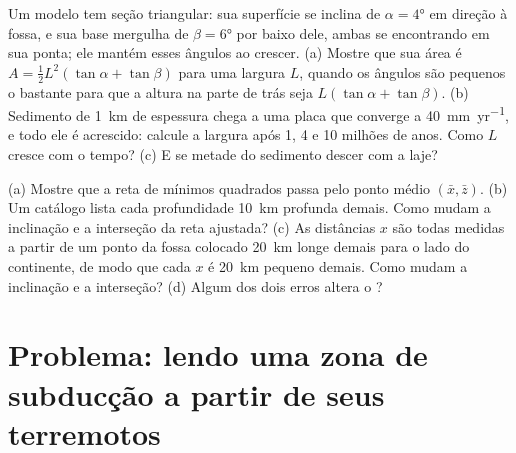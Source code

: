 \begin{exercise}[$\star\star\star$]\label{exo:b1:active-margins:11}
Um  modelo tem seção triangular: sua superfície se inclina de $\alpha = \ang{4}$ em direção à fossa, e sua base mergulha de $\beta = \ang{6}$ por baixo dele, ambas se encontrando em sua ponta; ele mantém esses ângulos ao crescer. (a) Mostre que sua área é $A = \frac12 L^2(\tan\alpha + \tan\beta)$ para uma largura $L$, quando os ângulos são pequenos o bastante para que a altura na parte de trás seja $L(\tan\alpha + \tan\beta)$. (b) Sedimento de \qty{1}{km} de espessura chega a uma placa que converge a \qty{40}{mm.yr^{-1}}, e todo ele é acrescido: calcule a largura após 1, 4 e 10 milhões de anos. Como $L$ cresce com o tempo? (c) E se metade do sedimento descer com a laje?
\end{exercise}

\begin{exercise}[$\star\star\star$]\label{exo:b1:active-margins:12}
(a) Mostre que a reta de mínimos quadrados passa pelo ponto médio
$(\bar x, \bar z)$. (b) Um catálogo lista cada profundidade \qty{10}{km} profunda demais. Como mudam a inclinação e a interseção da reta ajustada? (c) As distâncias $x$ são todas medidas a partir de um ponto da fossa colocado \qty{20}{km} longe demais para o lado do continente, de modo que cada $x$ é \qty{20}{km} pequeno demais. Como mudam a inclinação e a interseção? (d) Algum dos dois erros altera o ?
\end{exercise}

\section{Problema: lendo uma zona de subducção a partir de seus terremotos}

